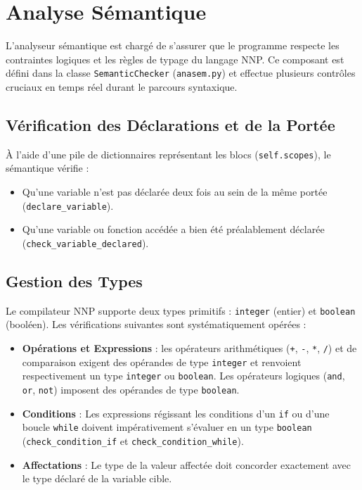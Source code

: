 \documentclass[a4paper, 12pt]{article}
\begin{document}
\newpage

\section{Analyse Sémantique}

L'analyseur sémantique est chargé de s'assurer que le programme respecte les contraintes logiques et les règles de typage du langage NNP. Ce composant est défini dans la classe \texttt{SemanticChecker} (\texttt{anasem.py}) et effectue plusieurs contrôles cruciaux en temps réel durant le parcours syntaxique.

\subsection{Vérification des Déclarations et de la Portée}
À l'aide d'une pile de dictionnaires représentant les blocs (\texttt{self.scopes}), le sémantique vérifie :
\begin{itemize}
    \item Qu'une variable n'est pas déclarée deux fois au sein de la même portée (\texttt{declare\_variable}).
    \item Qu'une variable ou fonction accédée a bien été préalablement déclarée (\texttt{check\_}\allowbreak\texttt{variable\_}\allowbreak\texttt{declared}).
\end{itemize}

\subsection{Gestion des Types}
Le compilateur NNP supporte deux types primitifs : \texttt{integer} (entier) et \texttt{boolean} (booléen). Les vérifications suivantes sont systématiquement opérées :
\begin{itemize}
    \item \textbf{Opérations et Expressions} : les opérateurs arithmétiques (\texttt{+}, \texttt{-}, \texttt{*}, \texttt{/}) et de comparaison exigent des opérandes de type \texttt{integer} et renvoient respectivement un type \texttt{integer} ou \texttt{boolean}. Les opérateurs logiques (\texttt{and}, \texttt{or}, \texttt{not}) imposent des opérandes de type \texttt{boolean}.
    \item \textbf{Conditions} : Les expressions régissant les conditions d'un \texttt{if} ou d'une boucle \texttt{while} doivent impérativement s'évaluer en un type \texttt{boolean} (\texttt{check\_condition\_if} et \texttt{check\_condition\_while}).
    \item \textbf{Affectations} : Le type de la valeur affectée doit concorder exactement avec le type déclaré de la variable cible.
\end{itemize}
\end{document}
